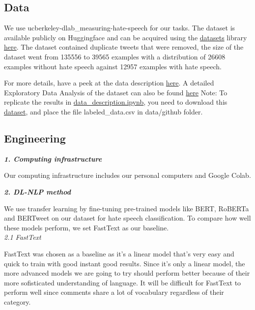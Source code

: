 \documentclass[a4paper, 10pt, conference]{IEEEtran}
\begin{document}
{{{{\subsection{Data}
We use ucberkeley-dlab\_measuring-hate-speech for our tasks. The dataset is available publicly on Huggingface and can be acquired using the \href{https://pypi.org/project/datasets/}{datasets} library \href{https://huggingface.co/datasets/ucberkeley-dlab/measuring-hate-speech}{here}. The dataset contained duplicate tweets that were removed, the size of the dataset went from 135556 to 39565 examples with a distribution of 26608 examples without hate speech against 12957 examples with hate speech.

For more details, have a peek at the data description \href{https://github.ubc.ca/sneha910/COLX_585_BERT-Fine-Tuning-Hate-Speech-Detection/blob/master/notebooks/data_description.ipynb}{here}. A detailed Exploratory Data Analysis of the dataset can also be found \href{https://github.ubc.ca/sneha910/COLX_585_BERT-Fine-Tuning-Hate-Speech-Detection/blob/master/notebooks/EDA.ipynb}{here} 
Note: To replicate the results in \href{https://github.ubc.ca/sneha910/COLX_585_BERT-Fine-Tuning-Hate-Speech-Detection/blob/master/notebooks/data_description.ipynb}{data\_description.ipynb}, you need to download this \href{https://github.com/t-davidson/hate-speech-and-offensive-language/tree/master/data}{dataset}, and place the file labeled\_data.csv in data/github folder.

\subsection{Engineering}

\vspace{1em}
\noindent\textit{\bf 1. Computing infrastructure}

Our computing infrastructure includes our personal computers and Google Colab.

\vspace{1em}
\noindent\textit{\bf 2. DL-NLP method}

We use transfer learning by fine-tuning pre-trained models like BERT, RoBERTa and BERTweet on our dataset for hate speech classification. To compare how well these models perform, we set FastText as our baseline.\\

\noindent\textit{2.1 FastText}

FastText was chosen as a baseline as it's a linear model that's very easy and quick to train with good instant good results. Since it's only a linear model, the more advanced models we are going to try should perform better because of their more sofisticated understanding of language. It will be difficult for FastText to perform well since comments share a lot of vocabulary regardless of their category.\\

}}}}
\end{document}

